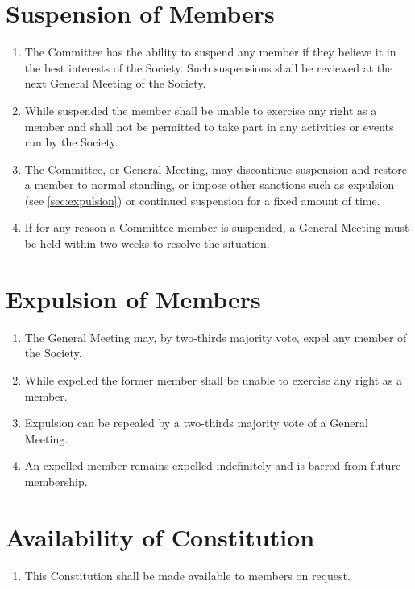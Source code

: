 \documentclass[a4paper]{article}
\begin{document}
\section{Suspension of Members} \label{sec:member_suspension}
\begin{enumerate}
    \item The Committee has the ability to suspend any member if they believe it in the best interests of the Society. Such suspensions shall be reviewed at the next General Meeting of the Society.
    \item While suspended the member shall be unable to exercise any right as a member and shall not be permitted to take part in any activities or events run by the Society.
    \item The Committee, or General Meeting, may discontinue suspension and restore a member to normal standing, or impose other sanctions such as expulsion (see \cref{sec:expulsion}) or continued suspension for a fixed amount of time.
    \item \label{committee_suspended} If for any reason a Committee member is suspended, a General Meeting must be held within two weeks to resolve the situation.
\end{enumerate}


\section{Expulsion of Members\label{sec:expulsion}}
\begin{enumerate}
    \item The General Meeting may, by two-thirds majority vote, expel any member of the Society.
    \item While expelled the former member shall be unable to exercise any right as a member. 
    \item Expulsion can be repealed by a two-thirds majority vote of a General Meeting.
    \item An expelled member remains expelled indefinitely and is barred from future membership.
\end{enumerate}


\section{Availability of Constitution}
\begin{enumerate}
	\item This Constitution shall be made available to members on request.
\end{enumerate}
\end{document}
